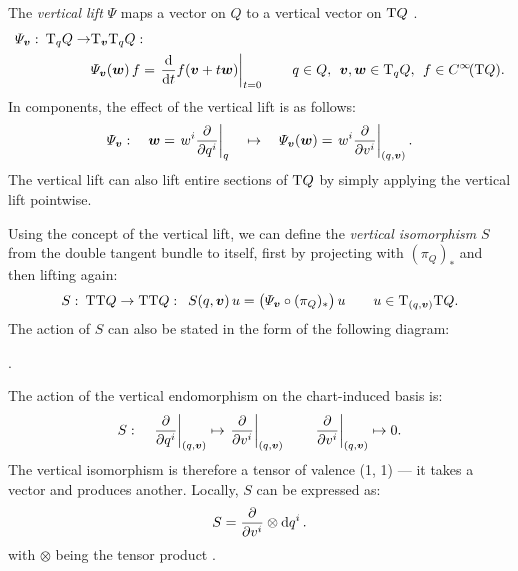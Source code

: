 The \emph{vertical lift} \(\Psi\) maps a vector on \(Q\) to a vertical vector on \(\mathrm{T}Q\) \cite{Carinena1990}.
\begin{equation}
    \begin{split}
        \Psi_{\vec{v}}:\:\tspace{q}{Q} \to & \tspace{\vec{v}}{\tspace{q}{Q}}: \\ 
        & \Psi_{\vec{v}}(\vec{w})\,f = \left. \dv{}{t} f(\vec{v} + t\vec{w})\right |_{t = 0}
        \qquad q \in Q,\:\: \vec{v},\vec{w}\in \tspace{q}{Q},\:\: f \in \functions{\tbundle{Q}}.
    \end{split}
\end{equation}
In components, the effect of the vertical lift is as follows:
\begin{equation}
     \Psi_{\vec{v}}: \quad \vec{w} = \left. w^i \pdv{}{q^i}\right|_q \quad \mapsto \quad  \Psi_{\vec{v}}(\vec{w}) = \left.w^i \pdv{}{v^i}\right|_{(q, \vec{v})}.
\end{equation}
The vertical lift can also lift entire sections of \(\mathrm{T}Q\) by simply applying the vertical lift pointwise.

Using the concept of the vertical lift, we can define the \emph{vertical isomorphism} \(S\) from the double tangent bundle to itself, first by projecting with \((\pi_Q)_*\) and then lifting again:
\begin{equation}
    S:\:\tbundle{\tbundle{Q}} \to \tbundle{\tbundle{Q}}:\:\; S(q, \vec{v})\,u = \big(\Psi_{\vec{v}} \circ (\pi_Q)_*\big)\,u \qquad u \in \tspace{(q, \vec{v})}{\tbundle{Q}}.
\end{equation}
The action of \(S\) can also be stated in the form of the following diagram:
\begin{center}
   .
\end{center}
The action of the vertical endomorphism on the chart-induced basis is:
\begin{equation}
     S: \quad \left. \pdv{}{q^i}\right|_{(q, \vec{v})} \mapsto \left.\pdv{}{v^i}\right|_{(q, \vec{v})} \qquad  \left. \pdv{}{v^i}\right|_{(q, \vec{v})} \mapsto 0.
\end{equation}
The vertical isomorphism is therefore a tensor of valence (1, 1) --- it takes a vector and produces another. Locally, \(S\) can be expressed as:
\begin{equation}
     S = \pdv{}{v^i}\otimes \dd{q^i}.
\end{equation}
with \(\otimes\) being the tensor product \cite{Carinena1990}.

